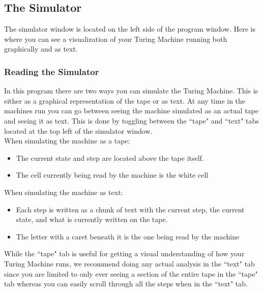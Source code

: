 \documentclass[12pt,letterpaper]{article}
\begin{document}
\subsection{The Simulator}
\noindent The simulator window is located on the left side of the program window. Here is where you can see a visualization of your Turing Machine running both graphically and as text.
	\subsubsection{Reading the Simulator}
	In this program there are two ways you can simulate the Turing Machine. This is either as a graphical representation of the tape or as text. At any time in the machines run you can go between seeing the machine simulated as an actual tape and seeing it as text. This is done by toggling between the ``tape" and ``text" tabs located at the top left of the simulator window.\\
	
	\noindent When simulating the machine as a tape:
	\begin{itemize}
		\item The current state and step are located above the tape itself.
		\item The cell currently being read by the machine is the white cell 
	\end{itemize}
	
	\noindent When simulating the machine as text:
	\begin{itemize}
		\item Each step is written as a chunk of text with the current step, the current state, and what is currently written on the tape.
		\item The letter with a caret beneath it is the one being read by the machine
	\end{itemize}

	\noindent While the ``tape" tab is useful for getting a visual understanding of how your Turing Machine runs, we recommend doing any actual analysis in the ``text" tab since you are limited to only ever seeing a section of the entire tape in the ``tape" tab whereas you can easily scroll through all the steps when in the ``text" tab.
	
\end{document}
